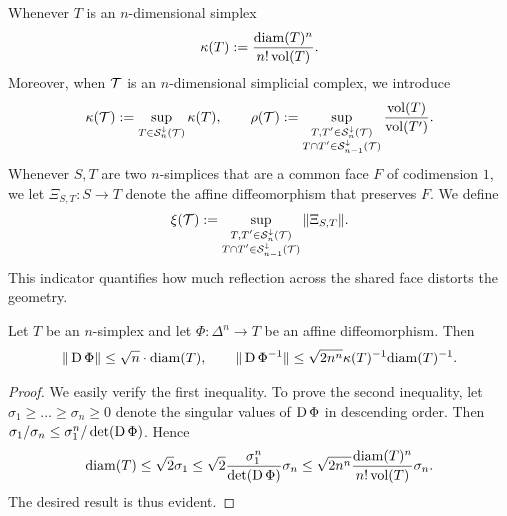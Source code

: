 \documentclass[a4paper]{article}
\begin{document}
Whenever $T$ is an $n$-dimensional simplex 
\begin{align*}
    \kappa(T)
    := 
    \frac{ {\operatorname{diam}}(T)^{n} }{ n! \operatorname{vol}(T) }
    .
\end{align*}
Moreover, when ${\mathcal T}$ is an $n$-dimensional simplicial complex, we introduce 
\begin{align*}
    \kappa({\mathcal T}) := \sup_{ T \in {\mathcal S}^{\downarrow}_{n}({\mathcal T}) } \kappa(T),
    \qquad 
    \rho({\mathcal T}) := \sup_{ \substack{ T, T' \in {\mathcal S}^{\downarrow}_{n}({\mathcal T}) \\ T \cap T' \in {\mathcal S}^{\downarrow}_{n-1}({\mathcal T}) } } \frac{ \operatorname{vol}(T) }{ \operatorname{vol}(T') }.
\end{align*}
Whenever $S,T$ are two $n$-simplices that are a common face $F$ of codimension $1$, we let $\Xi_{S,T} : S \rightarrow T$ denote the affine diffeomorphism 
that preserves $F$. We define 
\begin{align*}
    \xi({\mathcal T}) := \sup_{ \substack{ T, T' \in {\mathcal S}^{\downarrow}_{n}({\mathcal T}) \\ T \cap T' \in {\mathcal S}^{\downarrow}_{n-1}({\mathcal T}) } } \| \Xi_{S,T} \|.
\end{align*}
This indicator quantifies how much reflection across the shared face distorts the geometry. 




\begin{lemma}\label{lemma:affinetransform}
    Let $T$ be an $n$-simplex and let $\Phi : \Delta^{n} \rightarrow T$ be an affine diffeomorphism. Then 
    \begin{align*}
        \| \operatorname{D} \Phi \|
        \leq 
        \sqrt{n} \cdot {\operatorname{diam}}(T)
        ,
        \qquad 
        \| \operatorname{D} \Phi^{-1} \|
        \leq 
        \sqrt{2n^{n}} 
        \kappa(T)^{-1}
        {\operatorname{diam}}(T)^{-1}
        .
    \end{align*}
\end{lemma}
\begin{proof}
    We easily verify the first inequality. To prove the second inequality, let $\sigma_1 \geq \dots \geq \sigma_n \geq 0$ denote the singular values of $\operatorname{D}\Phi$ in descending order.
    Then $\sigma_1/\sigma_n \leq \sigma_1^{n} / \det(\operatorname{D}\Phi)$. Hence 
    \[
        {\operatorname{diam}}(T) 
        \leq 
        \sqrt{2} \sigma_1 
        \leq 
        \sqrt{2} 
        \frac{ \sigma_1^{n} }{ \det(\operatorname{D}\Phi) } 
        \sigma_n
        \leq 
        \sqrt{2n^{n}} 
        \frac{ {\operatorname{diam}}(T)^{n} }{ n! \operatorname{vol}(T) } 
        \sigma_n
        .
    \]
    The desired result is thus evident. 
\end{proof}
    
\end{document}

